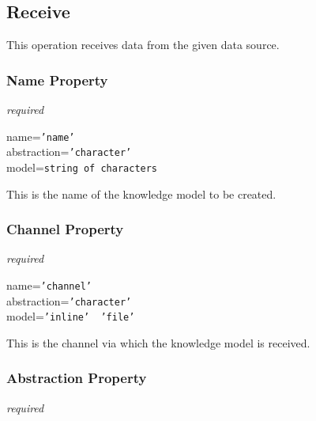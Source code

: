 %
%
%
%
%
%

\subsection{Receive}
\label{receive_heading}

This operation receives data from the given data source.

\subsubsection{Name Property}

\emph{required}

name=\texttt{'name'}\\
abstraction=\texttt{'character'}\\
model=\texttt{string of characters}

This is the name of the knowledge model to be created.

\subsubsection{Channel Property}

\emph{required}

name=\texttt{'channel'}\\
abstraction=\texttt{'character'}\\
model=\texttt{'inline' \vline\ 'file'}

This is the channel via which the knowledge model is received.

\subsubsection{Abstraction Property}

\emph{required}

